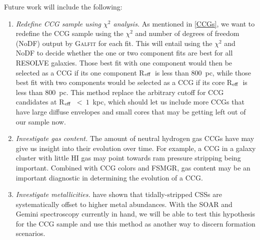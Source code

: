 \documentclass[iop,apj]{emulateapj}
\newcommand{\Reff}{R$_{\rm eff}$}
\begin{document}
Future work will include the following:

\begin{enumerate}

\item \textit{Redefine CCG sample using $\chi^2$ analysis.} As mentioned in \autoref{CCGs}, we want to redefine the CCG sample using the $\chi^2$ and number of degrees of freedom (NoDF) output by \textsc{Galfit} for each fit. This will entail using the $\chi^2$ and NoDF to decide whether the one or two component fits are best for all RESOLVE galaxies. Those best fit with one component would then be selected as a CCG if its one component \Reff\ is less than 800~pc, while those best fit with two components would be selected as a CCG if its core \Reff\ is less than 800~pc. This method replace the arbitrary cutoff for CCG candidates at \Reff~$<~1$~kpc, which should let us include more CCGs that have large diffuse envelopes and small cores that may be getting left out of our sample now.

\item \textit{Investigate gas content.} The amount of neutral hydrogen gas CCGs have may give us insight into their evolution over time. For example, a CCG in a galaxy cluster with little HI gas may point towards ram pressure stripping being important. Combined with CCG colors and FSMGR, gas content may be an important diagnostic in determining the evolution of a CCG.

\item \textit{Investigate metallicities.} \citet{Janz2015} have shown that tidally-stripped CSSs are systematically offset to higher metal abundances. With the SOAR and Gemini spectroscopy currently in hand, we will be able to test this hypothesis for the CCG sample and use this method as another way to discern formation scenarios.

\end{enumerate}








\end{document}
